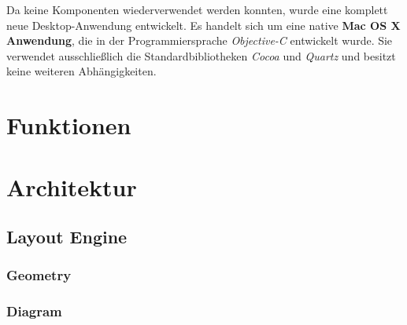 Da keine Komponenten wiederverwendet werden konnten, wurde eine komplett neue Desktop-Anwendung entwickelt. Es handelt sich um eine native \textbf{Mac OS X Anwendung}, die in der Programmiersprache \textit{Objective-C} entwickelt wurde. Sie verwendet ausschließlich die Standardbibliotheken \textit{Cocoa} und \textit{Quartz} und besitzt keine weiteren Abhängigkeiten.

\section{Funktionen}
\label{sec:functions}




\section{Architektur}
\label{sec:architecture}


\subsection{Layout Engine}


\subsubsection{Geometry}


\subsubsection{Diagram}
\label{subsubsec:component-diagram}



